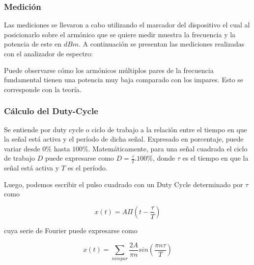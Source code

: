 \subsubsection{Medición}
Las mediciones se llevaron a cabo utilizando el marcador del dispositivo el cual al posicionarlo sobre el armónico que se quiere medir muestra la frecuencia y la potencia de este en $dBm$. A continuación se presentan las mediciones realizadas con el analizador de espectro:

\begin{table}[H]
\end{table}

Puede observarse cómo los armónicos múltiplos pares de la frecuencia fundamental tienen una potencia muy baja comparado con los impares. Esto se corresponde con la teoría.

\subsubsection{Cálculo del Duty-Cycle}	

Se entiende por duty cycle o ciclo de trabajo a la relación entre el tiempo en que la señal está activa y el período de dicha señal. Expresado en porcentaje, puede variar desde $0\%$ hasta $100\%$. Matemáticamente, para una señal cuadrada el ciclo de trabajo $D$ puede expresarse como $D=\frac{\tau}{T}.100\%$, donde $\tau$ es el tiempo en que la señal está activa y $T$ es el período.

Luego, podemos escribir el pulso cuadrado con un Duty Cycle determinado por $\tau$ como 

\begin{equation}
    x(t)=A\Pi(t-\frac{\tau}{T})
\end{equation}

cuya serie de Fourier puede expresarse como 

\begin{equation}
x(t)=\sum_{n impar}\frac{2A}{\pi n} sin(\frac{\pi n\tau}{T})
\end{equation}

